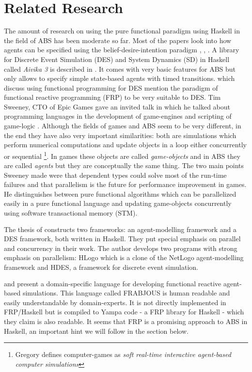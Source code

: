 \section{Related Research}
The amount of research on using the pure functional paradigm using Haskell in the field of ABS has been moderate so far. Most of the papers look into how agents can be specified using the belief-desire-intention paradigm \cite{de_jong_suitability_2014}, \cite{sulzmann_specifying_2007}, \cite{jankovic_functional_2007}. A library for Discrete Event Simulation (DES) and System Dynamics (SD) in Haskell called \textit{Aivika 3} is described in \cite{sorokin_aivika_2015}. It comes with very basic features for ABS but only allows to specify simple state-based agents with timed transitions.
\cite{jankovic_functional_2007} which discuss using functional programming for DES mention the paradigm of functional reactive programming (FRP) to be very suitable to DES. 
Tim Sweeney, CTO of Epic Games gave an invited talk in which he talked about programming languages in the development of game-engines and scripting of game-logic \cite{sweeney_next_2006}. Although the fields of games and ABS seem to be very different, in the end they have also very important similarities: both are simulations which perform numerical computations and update objects in a loop either concurrently or sequential \footnote{Gregory \cite{gregory_game_2018} defines computer-games as \textit{soft real-time interactive agent-based computer simulations}}. In games these objects are called \textit{game-objects} and in ABS they are called \textit{agents} but they are conceptually the same thing. The two main points Sweeney made were that dependent types could solve most of the run-time failures and that parallelism is the future for performance improvement in games. He distinguishes between pure functional algorithms which can be parallelized easily in a pure functional language and updating game-objects concurrently using software transactional memory (STM).

The thesis of \cite{bezirgiannis_improving_2013} constructs two frameworks: an agent-modelling framework and a DES framework, both written in Haskell. They put special emphasis on parallel and concurrency in their work. The author develops two programs with strong emphasis on parallelism: HLogo which is a clone of the NetLogo agent-modelling framework and HDES, a framework for discrete event simulation.

\cite{schneider_towards_2012} and \cite{vendrov_frabjous:_2014} present a domain-specific language for developing functional reactive agent-based simulations. This language called FRABJOUS is human readable and easily understandable by domain-experts. It is not directly implemented in FRP/Haskell but is compiled to Yampa code - a FRP library for Haskell - which they claim is also readable. It seems that FRP is a promising approach to ABS in Haskell, an important hint we will follow in the section below.